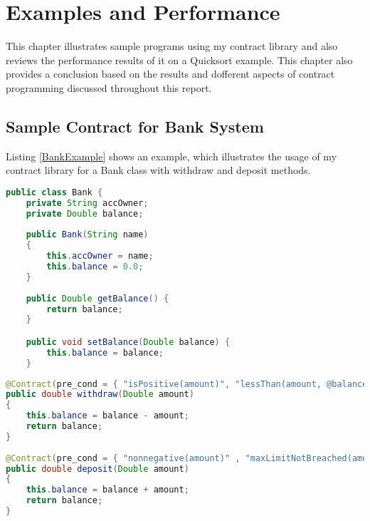 \chapter{Examples and Performance}\label{performance}

This chapter illustrates sample programs using my contract library and also reviews the performance results of it on a Quicksort example. This chapter also provides a conclusion based on the results and dofferent aspects of contract programming discussed throughout this report.

\section{Sample Contract for Bank System}

Listing \ref{BankExample} shows an example, which illustrates the usage of my contract library for a Bank class with withdraw and deposit methods. \linebreak

\begin{minipage}{\linewidth}
\begin{lstlisting}[frame=single, language=Java, caption={Java Contracts for Bank class - I}, label={BankExample}, captionpos=b, breaklines=true, showstringspaces=false]
public class Bank {
	private String accOwner;
	private Double balance;
	
	public Bank(String name)
	{
		this.accOwner = name;
		this.balance = 0.0;
	}
	
	public Double getBalance() {
		return balance;
	}

	public void setBalance(Double balance) {
		this.balance = balance;
	}

\end{lstlisting}
\end{minipage}

\begin{minipage}{\linewidth}

       
\begin{lstlisting}[frame=single, language=Java, caption={Java Contracts for Bank class - II}, label={BankExample2}, captionpos=b, breaklines=true, showstringspaces=false]
@Contract(pre_cond = { "isPositive(amount)", "lessThan(amount, @balance)" },post_cond = { "checkbalance(ans)" }, source_files = { "bankprolog.pl" })
public double withdraw(Double amount)
{
	this.balance = balance - amount;
	return balance;
}
	
@Contract(pre_cond = { "nonnegative(amount)" , "maxLimitNotBreached(amount)"}, post_cond = { "checkbalance(ans)" }, source_files = { "bankprolog.pl" })
public double deposit(Double amount)
{
	this.balance = balance + amount;
	return balance;
}


\end{lstlisting}
\end{minipage}
 
